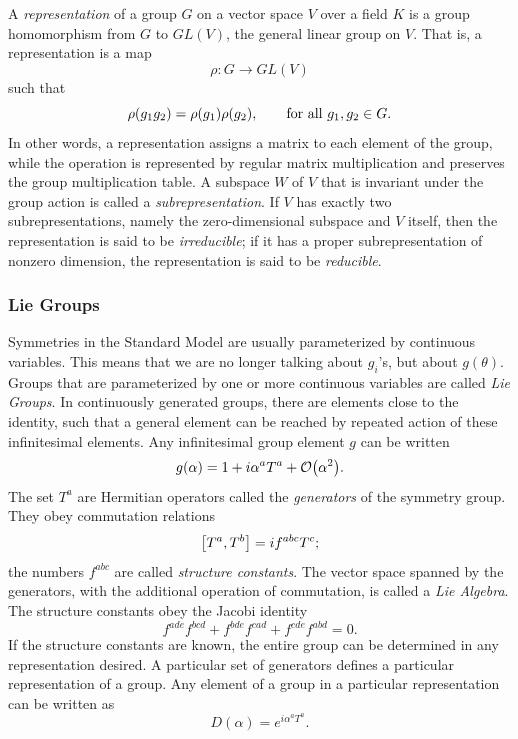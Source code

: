 A \emph{representation} of a group $G$ on a vector space $V$ over a field $K$ is a group homomorphism from $G$ to $GL(V)$, the general linear group on $V$. That is, a representation is a map
\begin{equation}
\rho:G\rightarrow GL(V)
\end{equation}
such that
\begin{equation}
\rho\qty(g_1 g_2)=\rho\qty(g_1)\rho\qty(g_2),\qquad \textrm{for all}\,\, g_1,g_2\in G.
\end{equation}
In other words, a representation assigns a matrix to each element of the group, while the operation is represented by regular matrix multiplication and preserves the group multiplication table. A subspace $W$ of $V$ that is invariant under the group action is called a \emph{subrepresentation}. If $V$ has exactly two subrepresentations, namely the zero-dimensional subspace and $V$ itself, then the representation is said to be \emph{irreducible}; if it has a proper subrepresentation of nonzero dimension, the representation is said to be \emph{reducible}. 

\subsubsection{Lie Groups}

Symmetries in the Standard Model are usually parameterized by continuous variables. This means that we are no longer talking about $g_i$'s, but about $g(\theta)$. Groups that are parameterized by one or more continuous variables are called \emph{Lie Groups}. In continuously generated groups, there are elements close to the identity, such that a general element can be reached by repeated action of these infinitesimal elements. Any infinitesimal group element $g$ can be written
\begin{equation}
g\qty(\alpha)=1+i\alpha^aT^a+\order{\alpha^2}.
\end{equation}
The set $T^a$ are Hermitian operators called the \emph{generators} of the symmetry group. They obey commutation relations
\begin{equation}
\comm{T^a}{T^b}=i f^{abc}T^c;
\end{equation}
the numbers $f^{abc}$ are called \emph{structure constants}. The vector space spanned by the generators, with the additional operation of commutation, is called a \emph{Lie Algebra}. The structure constants obey the Jacobi identity
\begin{equation}
f^{ade}f^{bcd}+f^{bde}f^{cad}+f^{cde}f^{abd}=0.
\end{equation}
If the structure constants are known, the entire group can be determined in any representation desired. A particular set of generators defines a particular representation of a group. Any element of a group in a particular representation can be written as
\begin{equation}
D(\alpha)=e^{i\alpha^{a}T^{a}}.
\end{equation}

